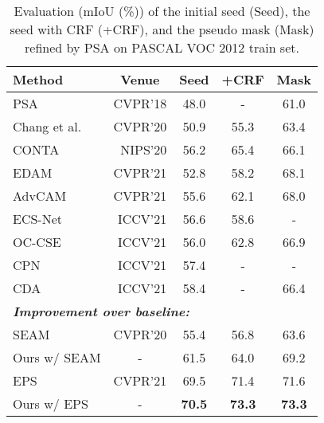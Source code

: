 \documentclass[10pt,twocolumn,letterpaper]{article}
\begin{document}
\begin{table}[tbp]
\small
\caption{Evaluation (mIoU (\%)) of the initial seed (Seed), the seed with CRF (+CRF), and the pseudo mask (Mask) refined by PSA \cite{ahn2018learningAffinityNet} on PASCAL VOC 2012 train set.}
\label{Tabel1: Affinity}
\centering
{}
\begin{tabular}{l|c|c|c|c}
\hline
\textbf{Method}          & \textbf{Venue}   & \textbf{Seed} & \textbf{+CRF} & \textbf{Mask} \\
\hline \hline
PSA \cite{ahn2018learningAffinityNet}             & \multicolumn{1}{r|}{CVPR'18} & 48.0 & -    & 61.0 \\
Chang et al. \cite{chang2020weaklySubCategory}     & \multicolumn{1}{r|}{CVPR'20} & 50.9 & 55.3 & 63.4 \\
CONTA \cite{zhang2020causalCONTA}           & \multicolumn{1}{r|}{NIPS'20} & 56.2 & 65.4 & 66.1 \\
EDAM \cite{wu2021embeddedEDMA}            & \multicolumn{1}{r|}{CVPR'21} & 52.8 & 58.2 & 68.1 \\
AdvCAM \cite{lee2021antiADVCAM}         & \multicolumn{1}{r|}{CVPR'21} & 55.6 & 62.1 & 68.0 \\
ECS-Net \cite{Sun_2021_ICCV_ECSNet}                              & \multicolumn{1}{r|}{ICCV'21} & 56.6 & 58.6 & - \\
OC-CSE \cite{kweon2021unlocking0C-CSE}                               & \multicolumn{1}{r|}{ICCV'21} & 56.0 & 62.8 & 66.9 \\
CPN \cite{zhang2021complementaryCPN}         & \multicolumn{1}{r|}{ICCV'21} & 57.4 & - & - \\
CDA \cite{Su_2021_ICCV_CDA}                                       & \multicolumn{1}{r|}{ICCV'21} & 58.4 & - & 66.4 \\
\hline
\multicolumn{5}{l}{\textit{\textbf{Improvement over baseline:}}}        \\
SEAM \cite{wang2020selfSEAM}        & \multicolumn{1}{r|}{CVPR'20} & 55.4 & 56.8 & 63.6 \\
Ours w/ SEAM & -       & 61.5\scriptsize{\color{red}{+6.1}} & 64.0\scriptsize{\color{red}{+7.2}} & 69.2\scriptsize{\color{red}{+5.6}} \\
EPS \cite{lee2021railroadEPS}         & \multicolumn{1}{r|}{CVPR'21} & 69.5 & 71.4 & 71.6 \\
Ours w/ EPS  & -       & \textbf{70.5}\scriptsize{\color{red}{+1.0}} &\textbf{73.3}\scriptsize{\color{red}{+1.9}} & \textbf{73.3}\scriptsize{\color{red}{+1.7}}   \\
\hline
\end{tabular}
\end{table}
\end{document}
